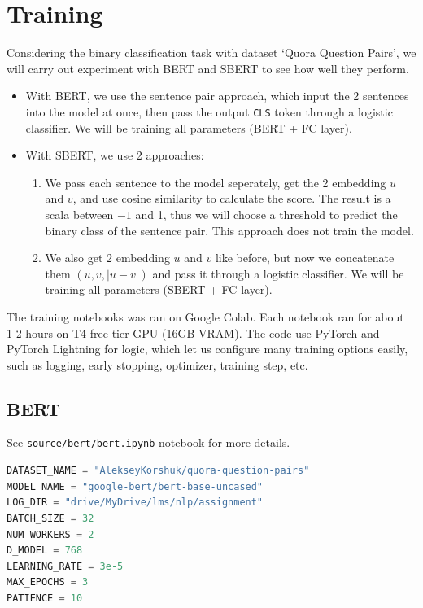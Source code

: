 \section{Training}

Considering the binary classification task with dataset `Quora Question Pairs', we will carry out experiment with BERT and SBERT to see how well they perform. 

\begin{itemize}
    \item With BERT, we use the sentence pair approach, which input the 2 sentences into the model at once, then pass the output \texttt{CLS} token through a logistic classifier. We will be training all parameters (BERT + FC layer).
    \item With SBERT, we use 2 approaches:
    \begin{enumerate}
        \item We pass each sentence to the model seperately, get the 2 embedding $u$ and $v$, and use cosine similarity to calculate the score. The result is a scala between $-1$ and 1, thus we will choose a threshold to predict the binary class of the sentence pair. This approach does not train the model.
        \item We also get 2 embedding $u$ and $v$ like before, but now we concatenate them $(u,v,|u-v|)$ and pass it through a logistic classifier. We will be training all parameters (SBERT + FC layer).
    \end{enumerate}
\end{itemize}

The training notebooks was ran on Google Colab. Each notebook ran for about 1-2 hours on T4 free tier GPU (16GB VRAM). The code use PyTorch and PyTorch Lightning for logic, which let us configure many training options easily, such as logging, early stopping, optimizer, training step, etc.


\subsection{BERT}

See \texttt{source/bert/bert.ipynb} notebook for more details.

\begin{lstlisting}[language=python, caption={Configs and hyperparams}]
DATASET_NAME = "AlekseyKorshuk/quora-question-pairs"
MODEL_NAME = "google-bert/bert-base-uncased"
LOG_DIR = "drive/MyDrive/lms/nlp/assignment"
BATCH_SIZE = 32
NUM_WORKERS = 2
D_MODEL = 768
LEARNING_RATE = 3e-5
MAX_EPOCHS = 3
PATIENCE = 10
\end{lstlisting}


